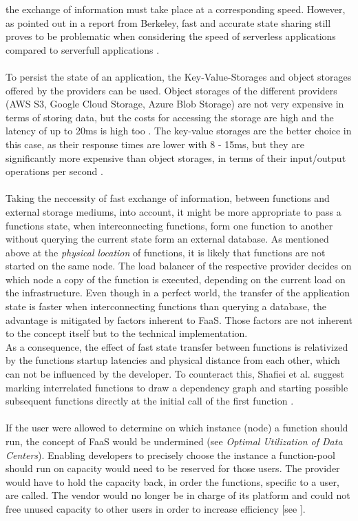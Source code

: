 \documentclass[a4paper,twoside,11pt, pagesize]{scrartcl}
\begin{document}
the exchange of information must take place at a corresponding speed. However, as pointed out in a report from Berkeley, fast and accurate state sharing still proves to be problematic when considering the speed of serverless applications compared to serverfull applications \cite{jonas2019cloud}.\\\\ To persist the state of an application, the Key-Value-Storages and object storages offered by the providers can be used. Object storages of the different providers (AWS S3, Google Cloud Storage, Azure Blob Storage) are not very expensive in terms of storing data, but the costs for accessing the storage are high and the latency of up to 20ms is high too \cite{jonas2019cloud}. The key-value storages are the better choice in this case, as their response times are lower with 8 - 15ms, but they are significantly more expensive than object storages, in terms of their input/output operations per second \cite{jonas2019cloud}.\\\\ Taking the neccessity of fast exchange of information, between functions and external storage mediums, into account, it might be more appropriate to pass a functions state, when interconnecting functions, form one function to another without querying the current state form an external database. As mentioned above at the \textit{physical location} of functions, it is likely that functions are not started on the same node. The load balancer of the respective provider decides on which node a copy of the function is executed, depending on the current load on the infrastructure. Even though in a perfect world, the transfer of the application state is faster when interconnecting functions than querying a database, the advantage is mitigated by factors inherent to FaaS. Those factors are not inherent to the concept itself but to the technical implementation.\\ As a consequence, the effect of fast state transfer between functions is relativized by the functions startup latencies and physical distance from each other, which can not be influenced by the developer. To counteract this, Shaﬁei et al. suggest marking interrelated functions to draw a dependency graph and starting possible subsequent functions directly at the initial call of the first function \cite{shafiei2020serverless}.\\\\ If the user were allowed to determine on which instance (node) a function should run, the concept of FaaS would be undermined (see \textit{Optimal Utilization of Data Centers}). Enabling developers to precisely choose the instance a function-pool should run on capacity would need to be reserved for those users. The provider would have to hold the capacity back, in order the functions, specific to a user, are called. The vendor would no longer be in charge of its platform and could not free unused capacity to other users in order to increase efficiency [see \cite{fowler2018serverless}]. 
\end{document}

